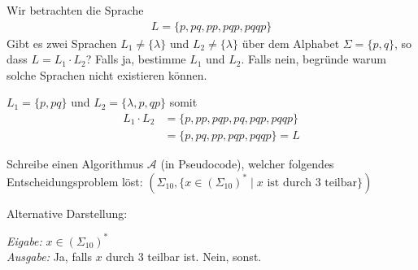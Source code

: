 \documentclass[a4paper,ngerman,12pt]{exam}
\begin{document}
\begin{questions}
\question
Wir betrachten die Sprache
  \begin{align*}
    L = \{p, pq, pp, pqp, pqqp\}
  \end{align*}
  Gibt es zwei Sprachen $L_1 \neq \{\lambda\}$ und $L_2 \neq \{\lambda\}$ über dem
  Alphabet $\Sigma = \{p,q\}$, so dass $L = L_1 \cdot L_2$?
  Falls ja, bestimme $L_1$ und $L_2$. Falls nein, begründe warum solche Sprachen nicht
  existieren können.
  \begin{solutionorbox}[6em]
    $L_1 = \{p,pq\}$ und $L_2 = \{\lambda, p, qp\}$ somit
    \begin{align*}
      L_1 \cdot L_2 &= \{p, pp, pqp, pq, pqp, pqqp\} \\
        &= \{p, pq, pp, pqp, pqqp\} = L
    \end{align*}
  \end{solutionorbox}

\question
Schreibe einen Algorithmus $\mathcal{A}$ (in Pseudocode), welcher folgendes
Entscheidungsproblem löst:
$(\Sigma_{10}, \{x \in (\Sigma_{10})^* \mid x \text{ ist durch 3 teilbar}\})$

Alternative Darstellung:

\textit{Eigabe:} $x \in \left(\Sigma_{10}\right)^*$ \\
\textit{Ausgabe:} Ja, falls $x$ durch 3 teilbar ist. Nein, sonst.
  \begin{solutionorbox}[8em]
  \begin{algorithmic}[1]
        \State {}
    \EndFunction
  \end{algorithmic}
  \end{solutionorbox}

\end{questions}
\end{document}
